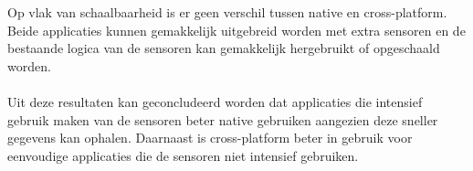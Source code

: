 \\\\
Op vlak van schaalbaarheid is er geen verschil tussen native en cross-platform. Beide applicaties kunnen
gemakkelijk uitgebreid worden met extra sensoren en de bestaande logica van de sensoren kan gemakkelijk 
hergebruikt of opgeschaald worden.
\\\\
Uit deze resultaten kan geconcludeerd worden dat applicaties die intensief gebruik maken van de sensoren 
beter native gebruiken aangezien deze sneller gegevens kan ophalen. Daarnaast is cross-platform beter in gebruik 
voor eenvoudige applicaties die de sensoren niet intensief gebruiken.















